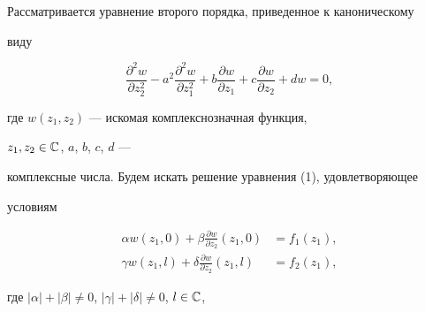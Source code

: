  


\date{} 




\pagestyle{plain} %


 




\maketitle 


\label{begin} 


 


Рассматривается уравнение второго порядка, приведенное к каноническому 


виду 


\begin{equation} 


\frac{\partial^2w}{\partial z^2_2}-a^2 


\frac{\partial^2w}{\partial z^2_1}+b 


\frac{\partial w}{\partial z_1}+c 


\frac{\partial w}{\partial z_2}+dw=0, 


\end{equation} 


где $w(z_1,z_2)$ --- искомая комплекснозначная функция, 


$z_1,z_2\in\Bbb C$, $a$, $b$, $c$, $d$ --- 


комплексные числа. Будем искать решение уравнения (1), удовлетворяющее 


условиям 


\begin{equation} 


\begin{split} 


\alpha w(z_1,0)+\beta\frac{\partial w}{\partial z_2} 


(z_1,0)&=f_1(z_1),\\ 


\gamma w(z_1,l)+\delta\frac{\partial w}{\partial z_2} 


(z_1,l)&=f_2(z_1),


\end{split} 


\end{equation} 


где $|\alpha|+|\beta|\ne 0$, $|\gamma|+|\delta|\ne 0$, $l\in \Bbb C$, 


